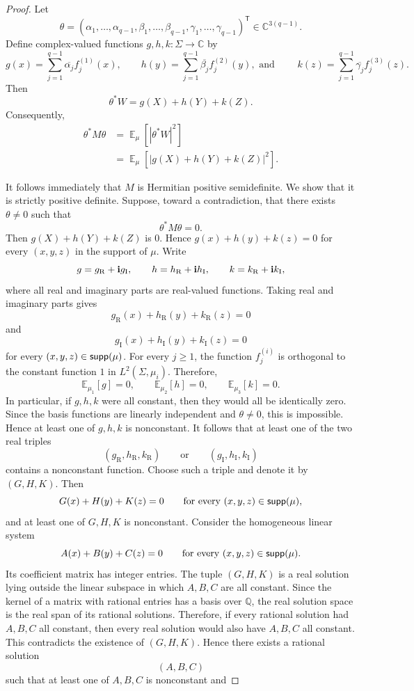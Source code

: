 \documentclass[10pt,a4paper]{amsart}
\newcommand\Expect[2]{{\mathop{\mathbb{E}}_{#1}\left[ {#2} \right]}}
\renewcommand\geq{\geqslant}
\begin{document}
\begin{proof}
Let
\[ \theta= (\alpha_1,\ldots,\alpha_{q-1}, \beta_1,\ldots,\beta_{q-1}, \gamma_1,\ldots,\gamma_{q-1})^{\mathsf T} \in\mathbb{C}^{3(q-1)}. \] 
%
Define complex-valued functions $g,h,k:\Sigma\to\mathbb{C}$ by 
%
\[ g(x) = \sum_{j=1}^{q-1}\overline{\alpha_j}f^{(1)}_j(x), \quad\quad h(y) = \sum_{j=1}^{q-1}\overline{\beta_j}f^{(2)}_j(y),  \mbox{ and } \quad\quad k(z) = \sum_{j=1}^{q-1}\overline{\gamma_j}f^{(3)}_j(z). \] 
Then 
\[ \theta^*W=g(X)+h(Y)+k(Z). \] 
Consequently, 
\[ \begin{aligned} \theta^*M\theta &= \Expect{\mu}{ \left| \theta^*W \right|^2 }\\ &=  \Expect{\mu}{\left| g(X)+h(Y)+k(Z)  \right|^2}. \end{aligned} \] 

It follows immediately that $M$ is Hermitian positive semidefinite. We show that it is strictly positive definite. Suppose, toward a contradiction, that there exists $\theta\neq 0$ such that 
\[ \theta^*M\theta=0. \] 
Then $g(X)+h(Y)+k(Z)$ is $0$. Hence $g(x)+h(y)+k(z)=0$ for every $(x,y,z)$ in the support of $\mu$. 
Write 
\[ g=g_{\mathrm R}+{\bf i}g_{\mathrm I},\qquad h=h_{\mathrm R}+{\bf i}h_{\mathrm I},\qquad k=k_{\mathrm R}+{\bf i}k_{\mathrm I}, \]
%
where all real and imaginary parts are real-valued functions. Taking real and imaginary parts gives 
\[ g_{\mathrm R}(x)+h_{\mathrm R}(y)+k_{\mathrm R}(z) = 0 \]
and 
\[ g_{\mathrm I}(x)+h_{\mathrm I}(y)+k_{\mathrm I}(z) =0 \]
for every $(x,y,z)\in {\sf supp}(\mu)$. For every $j\geq 1$, the function $f^{(i)}_j$ is orthogonal to the constant function $1$ in $L^2(\Sigma,\mu_i)$. Therefore, 
\[ \mathbb{E}_{\mu_1}[g]=0,\qquad \mathbb{E}_{\mu_2}[h]=0,\qquad \mathbb{E}_{\mu_3}[k]=0. \]
%
In particular, if $g,h,k$ were all constant, then they would all be identically zero. Since the basis functions are linearly independent and $\theta\neq 0$, this is impossible. Hence at least one of $g,h,k$ is nonconstant. It follows that at least one of the two real triples 
\[ (g_{\mathrm R},h_{\mathrm R},k_{\mathrm R}) \qquad\text{or}\qquad (g_{\mathrm I},h_{\mathrm I},k_{\mathrm I}) \]
contains a nonconstant function. Choose such a triple and denote it by $(G,H,K)$. Then 
\[ G(x)+H(y)+K(z)=0 \qquad \text{for every }(x,y,z)\in {\sf supp}(\mu), \]
and at least one of $G,H,K$ is nonconstant. Consider the homogeneous linear system 
\[ A(x)+B(y)+C(z)=0 \qquad \text{for every }(x,y,z)\in {\sf supp}(\mu). \]
Its coefficient matrix has integer entries. The tuple $(G,H,K)$ is a real solution lying outside the linear subspace in which $A,B,C$ are all constant. Since the kernel of a matrix with rational entries has a basis over $\mathbb{Q}$, the real solution space is the real span of its rational solutions. Therefore, if every rational solution had $A,B,C$ all constant, then every real solution would also have $A,B,C$ all constant. This contradicts the existence of $(G,H,K)$. Hence there exists a rational solution \[ (A,B,C) \] such that at least one of $A,B,C$ is nonconstant and 

\end{proof}
\end{document}
